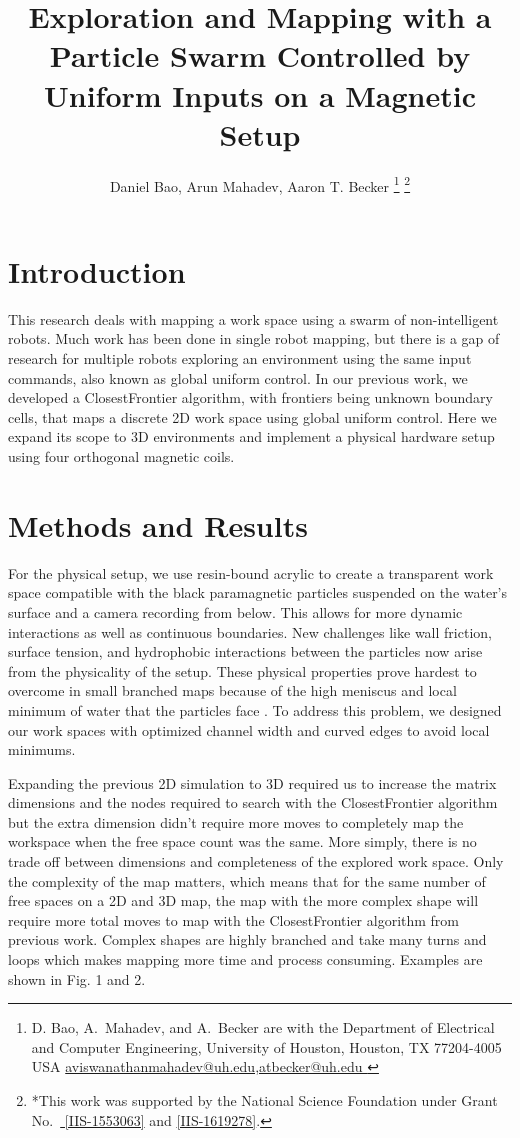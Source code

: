 \documentclass[letterpaper, 9 pt, conference]{ieeeconf}  %
\title{\LARGE \bf
Exploration and Mapping with a Particle Swarm Controlled by Uniform Inputs on a Magnetic Setup
}
\author{Daniel Bao, Arun Mahadev, Aaron T. Becker%
\thanks{D. Bao, A.~Mahadev, and A.~Becker are with the Department of Electrical and Computer Engineering,  University of Houston, Houston, TX 77204-4005 USA 
      \protect\url{ aviswanathanmahadev@uh.edu,atbecker@uh.edu }}
\thanks{*This work was supported by the National Science Foundation under Grant No.\ \href{http://nsf.gov/awardsearch/showAward?AWD_ID=1553063}{ [IIS-1553063]} and \href{http://nsf.gov/awardsearch/showAward?AWD_ID=1619278}{[IIS-1619278]}.}%
}
\begin{document}
\maketitle
\thispagestyle{empty}
\pagestyle{empty}


\section{Introduction}\label{sec:Introduction}
	This research deals with mapping a work space using a swarm of non-intelligent robots. Much work has been done in single robot mapping, but there is a gap of research for multiple robots exploring an environment using the same input commands, also known as global uniform control. In our previous work\cite{AAM}, we developed a ClosestFrontier algorithm, with frontiers being unknown boundary cells, that maps a discrete 2D work space using global uniform control. Here we expand its scope to 3D environments and implement a physical hardware setup using four orthogonal magnetic coils.
\section{Methods and Results}\label{sec:Methods and Results}
	For the physical setup, we use resin-bound acrylic to create a transparent work space compatible with the black paramagnetic particles suspended on the water's surface and a camera recording from below. This allows for more dynamic interactions as well as continuous boundaries. New challenges like wall friction, surface tension, and  hydrophobic interactions between the particles now arise from the physicality of the setup. These physical properties prove hardest to overcome in small branched maps because of the high meniscus and local minimum of water that the particles face . To address this problem, we designed our work spaces with optimized channel width and curved edges to avoid local minimums.
	
	Expanding the previous 2D simulation to 3D required us to increase the matrix dimensions and the nodes required to search with the ClosestFrontier algorithm but the extra dimension didn't require more moves to completely map the workspace when the free space count was the same. More simply, there is no trade off between dimensions and completeness of the explored work space. Only the complexity of the map matters, which means that for the same number of free spaces on a 2D and 3D map, the map with the more complex shape will require more total moves to map with the ClosestFrontier algorithm from previous work. Complex shapes are highly branched and take many turns and loops which makes mapping more time and process consuming. Examples are shown in Fig. 1 and 2.
\end{document}
